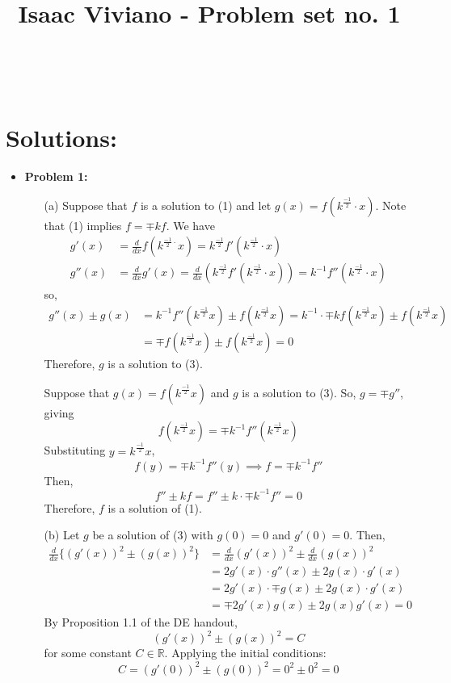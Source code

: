 \documentclass[12pt]{amsart}
\theoremstyle{definition}
\theoremstyle{remark}
\begin{document}
\title[Math 357 - Harmonic Analysis]{Isaac Viviano - Problem set no. 1}

\begin{titlepage}
  \maketitle
\end{titlepage}

\newpage \ \newpage
\section{Solutions:} 

\begin{itemize}

\item {\bf{Problem 1:}} 

\begin{itemize}
\item[(a)] Suppose that $f$ is a solution to (1) and let $g(x)=f(k^{\frac{-1}{2}}\cdot x)$. Note that (1) implies $f=\mp kf$. We have \begin{align*}g'(x)&=\frac{d}{dx}f(k^{\frac{-1}{2}\cdot}x)=k^\frac{-1}{2}f'(k^{\frac{-1}{2}}\cdot x)\\
  g''(x)&= \frac{d}{dx}g'(x)=\frac{d}{dx}\left(k^{\frac{-1}{2}}f'(k^{\frac{-1}{2}}\cdot x)\right)=k^{-1}f''\left(k^{\frac{-1}{2}}\cdot x\right)\end{align*}so, \begin{align*}g''(x)\pm g(x)&=k^{-1}f''(k^{\frac{-1}{2}}x)\pm f(k^{\frac{-1}{2}}x)=k^{-1}\cdot\mp kf(k^{\frac{-1}{2}}x)\pm f(k^{\frac{-1}{2}}x)\\
  &=\mp f(k^{\frac{-1}{2}}x)\pm f(k^{\frac{-1}{2}}x)=0\end{align*}Therefore, $g$ is a solution to (3).
  
  Suppose that $g(x)=f(k^\frac{-1}{2}x)$ and $g$ is a solution to (3). So, $g=\mp g''$, giving $$f(k^{\frac{-1}{2}}x)=\mp k^{-1}f''(k^\frac{-1}{2}x)$$Substituting $y=k^\frac{-1}{2}x$, $$f(y)=\mp k^{-1}f''(y)\implies f=\mp k^{-1}f''$$Then, $$f''\pm kf=f''\pm k\cdot\mp k^{-1}f''=0$$Therefore, $f$ is a solution of (1).

\vspace{0.1 cm}
\item[(b)] Let $g$ be a solution of (3) with $g(0)=0$ and $g'(0)=0$. Then,\begin{align*}
  \frac{d}{dx}\{(g'(x))^{2}\pm(g(x))^{2}\}&=\frac{d}{dx}(g'(x))^{2}\pm \frac{d}{dx}(g(x))^{2}\\
  &=2g'(x)\cdot g''(x)\pm2g(x)\cdot g'(x)\\
  &=2g'(x)\cdot\mp g(x)\pm2g(x)\cdot g'(x)\\
  &=\mp2g'(x)g(x)\pm2g(x)g'(x)=0
  \end{align*}
  By Proposition 1.1 of the DE handout, $$(g'(x))^{2}\pm(g(x))^{2}=C$$for some constant $C\in \mathbb{R}$. Applying the initial conditions: $$C=(g'(0))^{2}\pm(g(0))^{2}=0^{2}\pm0^{2}=0$$
  

\end{itemize}
\end{itemize}
\end{document}
